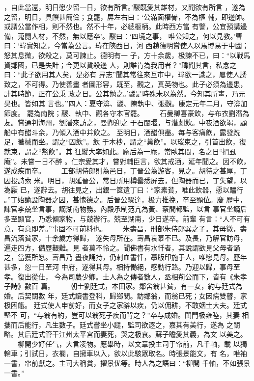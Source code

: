 \documentclass{ctexart}
\begin{document}
，自此當還，明日愿少留一日，欲有所言。'鬷既愛其雄材，又聞欲有所言 ，遂為之留，明日，具饌甚簡儉；食罷，屏左右曰：`公滿面權骨，不為樞 輔，即邊帥。或謂公當作相，則不然也。然不十年，必總樞柄。此時西方當 有警，公宜預講邊備，蒐閱人材，不然，無以應卒'。鬷曰：`四境之事， 唯公知之，何以見教。'曹曰：`瑋實知之，今當為公言。瑋在陝西日，河 西趙德明嘗使人以馬博易于中國；怒其息微，欲殺之，莫可諫止。德明有一 子，方十余歲，极諫不已，曰：``以戰馬資鄰國，已是失計；今更以貨殺邊 人，則誰肯為我用者？''瑋聞其言，私念之曰：``此子欲用其人矣，是必有 异志''聞其常往來互市中，瑋欲一識之，屢使人誘致之，不可得。乃使善畫 者圖形容，既至，觀之，真英物也。此子必須為邊患，計其時節，正在公秉 政之日。公其勉之。'鬷是時殊未以為然。今知其所畫，乃元昊也。皆如其 言也。''四人：夏守渰、鬷、陳執中、張觀。康定元年二月，守渰加節度。 罷為南院；鬷、執中、觀各守本官罷。 　　石曼卿喜豪飲，与布衣劉潛為友。嘗通判海州，劉潛來訪之，曼卿迎之 于石闥堰，与潛劇飲。中夜酒欲竭，顧船中有醋斗余，乃傾入酒中并飲之。 至明日，酒醋俱盡。每与客痛飲，露發跣足，著械而坐。謂之``囚飲''。飲 于木杪，謂之``巢飲''。以珱束之，引首出飲，復就束，謂之``鱉飲''。其 狂縱大率如此。廨后為一庵，常臥其間，名之日``捫虱庵''。未嘗一日不醉 。仁宗愛其才，嘗對輔臣言，欲其戒酒，延年聞之。因不飲，遂成疾而卒。 　　工部胡侍郎則為邑日，丁晉公為游客，見之。胡待之甚厚，丁因投詩索 米。明日，胡延晉公，常日所用樽罍悉屏去，但陶器而已，丁失望，以為厭 已，遂辭去。胡往見之，出銀一篋遺丁曰：``家素貧，唯此飲器，愿以贐行 。''丁始諭設陶器之因，甚愧德之。后晉公驟達，极力推挽，卒至顯位。慶 歷中，諫官李兢坐言事，謫湖南物務。內殿承制范亢為黃、蔡間都監，以言 事官坐謫后多至顯官，乃悉傾家物，与兢辦行。兢至湖南，少日遂卒。前輩 有言：``人不可有意，有意即差。''事固不可前料也。 　　朱壽昌，刑部朱侍郎巽之子。其母微，壽昌流落貧家，十余歲方得歸， 遂失母所在。壽昌哀慕不已。及長，乃解官訪母，遍走四方，備歷艱難。見 者莫不怜之。聞佛書有水忏者，其說謂欲見父母者誦之，當獲所愿。壽昌乃 晝夜誦持，仍剌血書忏，摹版印施于人，唯愿見母。歷年甚多，忽一日至河 中府，遂得其母。相持慟絕，感動行路。乃迎以歸，事母至孝。復出從仕， 今為司農少卿。士人為之傳者數人，丞相荊公而下，皆有《朱孝子詩》數百 篇。 　　朝士劉廷式，本田家。鄰舍翁甚貧，有一女，約与廷式為婚。后契闊數 年，廷式讀書登科，歸鄉閭。訪鄰翁，而翁已死；女因病雙瞽，家极困餓。 廷式使人申前好，而女子之家辭以疾，仍以佣耕，不敢姻士大夫。廷式堅不 可，``与翁有約，豈可以翁死子疾而背之？''卒与成婚。閨門极雍睦，其妻 相攜而后能行，凡生數子。廷式嘗坐小譴，監司欲逐之，嘉其有美行，遂為 之闊略。其后廷式管干江州太平宮而妻死，哭之极哀。蘇子瞻愛其義，為文 以美之。 　　柳開少好任气，大言凌物。應舉時，以文章投主司于帘前，凡千軸，載 以獨輪車；引試日，衣襴，自擁車以入，欲以此駭眾取名。時張景能文，有 名，唯袖一書，帘前獻之。主司大稱賞，擢景优等。時人為之語曰：``柳開 千軸，不如張景一書。''
\clearpage
\end{document}
